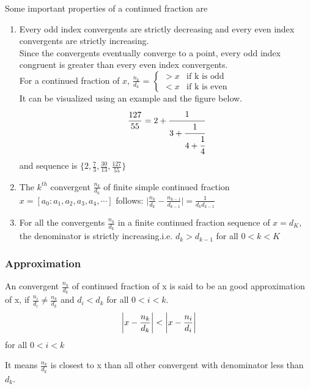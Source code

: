 Some important properties of a continued fraction are
\begin{enumerate}
    \item Every odd index convergents are strictly decreasing and every even index convergents are strictly increasing. 
    \\ Since the convergents eventually converge to a point, every odd index congruent is greater than every even index convergents. 
    \\For a continued fraction of $x$,
    $\frac{n_k}{d_k}$ = $\begin{cases}
                            >x &\text{if k is odd} \\
                            <x &\text{if k is even }
                        \end{cases}$
   \\ It can be visualized using an example and the figure below.
   \begin{equation*}
    \frac{127}{55} = 2+\cfrac{1}{3+\cfrac{1}{4+\cfrac{1}{4}}}
\end{equation*}
and sequence is $\{2,\frac{7}{3}, \frac{30}{13},\frac{127}{55}\}$
    \item The $k^{th}$ convergent $\frac{n_k}{d_k}$ of finite simple continued fraction $x=[a_0:a_1,a_2,a_3,a_4,\cdots ]$ follows:
    $\mid \frac{n_k}{d_k} - \frac{n_{k-1}}{d_{k-1}}\mid = \frac{1}{d_k d_{k-1}}$
    
    \item For all the convergents $\frac{n_k}{d_k}$ in a finite continued fraction sequence of $x=d_K$, the denominator is strictly increasing.i.e. $d_k > d_{k-1}$ for all $0<k<K$ 
\end{enumerate}

\subsubsection{Approximation}
\begin{definition}
    An convergent $\frac{n_k}{d_k}$ of continued fraction of x is said to be an good approximation of x, if $\frac{n_i}{d_i} \neq \frac{n_k}{d_k}$ and ${d_i} < {d_k}$ for all $0<i<k$.\cite{raji2013}
    \begin{equation*}
        \abs{ x - \frac{n_k}{d_k}} < \abs{x - \frac{n_i}{d_i}} 
    \end{equation*} for all $0<i<k$

\end{definition}
It means $\frac{n_k}{d_k}$ is closest to x than all other convergent with denominator less than $d_k$.

